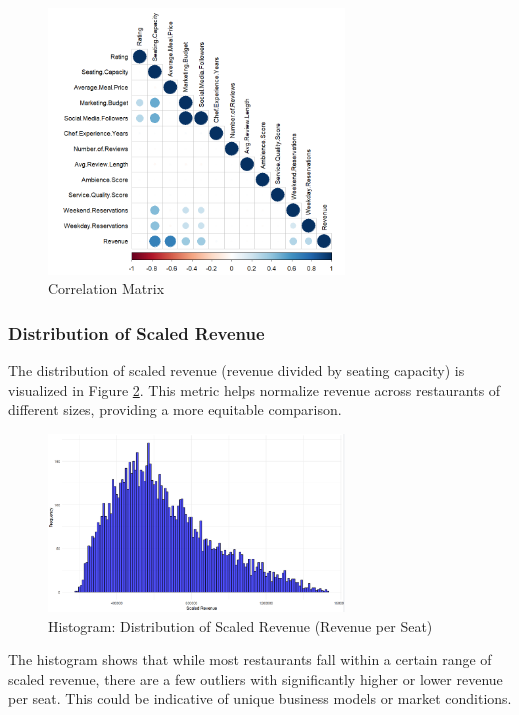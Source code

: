 \begin{figure}[H]
\centering
\includegraphics[width=0.7\textwidth]{img/d3.png}
\caption{Correlation Matrix}
\label{fig:correlation}
\end{figure}
\subsubsection{Distribution of Scaled Revenue}
The distribution of scaled revenue (revenue divided by seating capacity) is visualized in Figure \ref{fig:scaled_revenue_distribution}. This metric helps normalize revenue across restaurants of different sizes, providing a more equitable comparison.

\begin{figure}[H]
\centering
\includegraphics[width=0.7\textwidth]{img/d4.png}
\caption{Histogram: Distribution of Scaled Revenue (Revenue per Seat)}
\label{fig:scaled_revenue_distribution}
\end{figure}

The histogram shows that while most restaurants fall within a certain range of scaled revenue, there are a few outliers with significantly higher or lower revenue per seat. This could be indicative of unique business models or market conditions.

